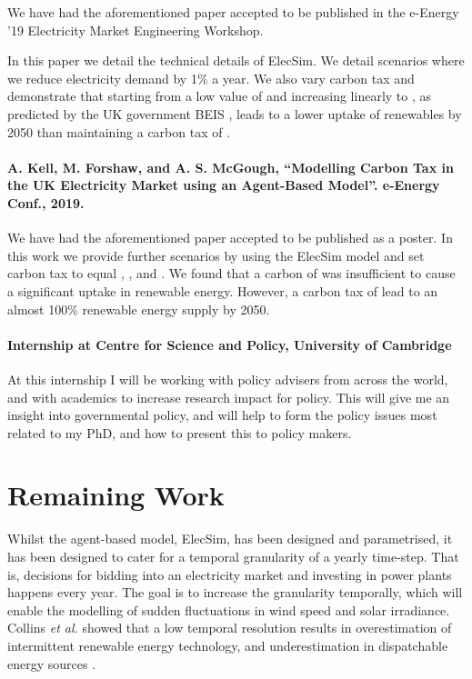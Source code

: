 \documentclass[12pt]{article}
\begin{document}
We have had the aforementioned paper accepted to be published in the e-Energy '19 Electricity Market Engineering Workshop.

In this paper we detail the technical details of ElecSim. We detail scenarios where we reduce electricity demand by 1\% a year. We also vary carbon tax and demonstrate that starting from a low value of  and increasing linearly to , as predicted by the UK government BEIS \cite{Department2016}, leads to a lower uptake of renewables by 2050 than maintaining a carbon tax of .

\paragraph{A. Kell, M. Forshaw, and A. S. McGough, ``Modelling Carbon Tax in the UK Electricity Market using an Agent-Based Model''. e-Energy Conf., 2019.}

We have had the aforementioned paper accepted to be published as a poster. In this work we provide further scenarios by using the ElecSim model and set carbon tax to equal , , and . We found that a carbon of  was insufficient to cause a significant uptake in renewable energy. However, a carbon tax of  lead to an almost 100\% renewable energy supply by 2050.


\paragraph{Internship at Centre for Science and Policy, University of Cambridge}

At this internship I will be working with policy advisers from across the world, and with academics to increase research impact for policy. This will give me an insight into governmental policy, and will help to form the policy issues most related to my PhD, and how to present this to policy makers.

\clearpage

\section{Remaining Work}

Whilst the agent-based model, ElecSim, has been designed and parametrised, it has been designed to cater for a temporal granularity of a yearly time-step. That is, decisions for bidding into an electricity market and investing in power plants happens every year. The goal is to increase the granularity temporally, which will enable the modelling of sudden fluctuations in wind speed and solar irradiance. Collins \textit{et al.} showed that a low temporal resolution results in overestimation of intermittent renewable energy technology, and underestimation in dispatchable energy sources \cite{Collins2017}.
\end{document}
